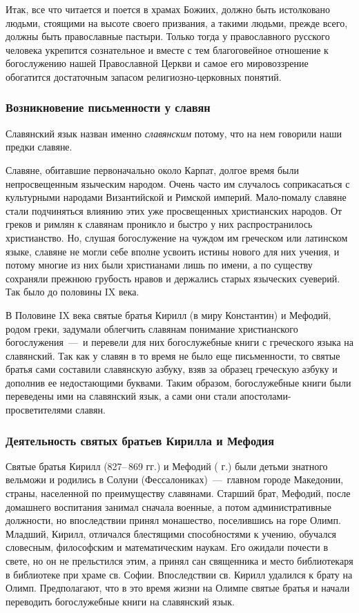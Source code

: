 \documentclass[11pt,a4paper,oneside]{memoir}
\begin{document}
Итак, все что читается и поется в храмах Божиих, должно быть истолковано людьми, стоящими на высоте своего призвания, а такими людьми, прежде всего, должны быть православные пастыри. Только тогда у православного русского человека укрепится сознательное и вместе с тем благоговейное отношение к богослужению нашей Православной Церкви и самое его мировоззрение обогатится достаточным запасом религиозно-церковных понятий.

\subsubsection{Возникновение письменности у славян}

Славянский язык назван именно \emph{славянским} потому, что на нем говорили наши предки славяне.

Славяне, обитавшие первоначально около Карпат, долгое время были непросвещенным языческим народом. Очень часто им случалось соприкасаться с культурными народами Византийской и Римской империй. Мало-помалу славяне стали подчиняться влиянию этих уже просвещенных христианских народов. От греков и римлян к славянам проникло и быстро у них распространилось христианство. Но, слушая богослужение на чуждом им греческом или латинском языке, славяне не могли себе вполне усвоить истины нового для них учения, и потому многие из них были христианами лишь по имени, а по существу сохраняли прежнюю грубость нравов и держались старых языческих суеверий. Так было до половины IX века.

В Половине IX века святые братья Кирилл (в миру Константин) и Мефодий, родом греки, задумали облегчить славянам понимание христианского богослужения~---~и перевели для них богослужебные книги с греческого языка на славянский. Так как у славян в то время не было еще письменности, то святые братья сами составили славянскую азбуку, взяв за образец греческую азбуку и дополнив ее недостающими буквами. Таким образом, богослужебные книги были переведены ими на славянский язык, а сами они стали апостолами-просветителями славян.

\subsubsection{Деятельность святых братьев Кирилла и Мефодия}

Святые братья Кирилл (827--\,869 гг.) и Мефодий ( г.) были детьми знатного вельможи и родились в Солуни (Фессалониках)~---~главном городе Македонии, страны, населенной по преимуществу славянами. Старший брат, Мефодий, после домашнего воспитания занимал сначала военные, а потом административные должности, но впоследствии принял монашество, поселившись на горе Олимп. Младший, Кирилл, отличался блестящими способностями к учению, обучался словесным, философским и математическим наукам. Его ожидали почести в свете, но он не прельстился этим, а принял сан священника и место библиотекаря в библиотеке при храме св. Софии. Впоследствии св. Кирилл удалился к брату на Олимп. Предполагают, что в это время жизни на Олимпе святые братья и начали переводить богослужебные книги на славянский язык.
\end{document}
